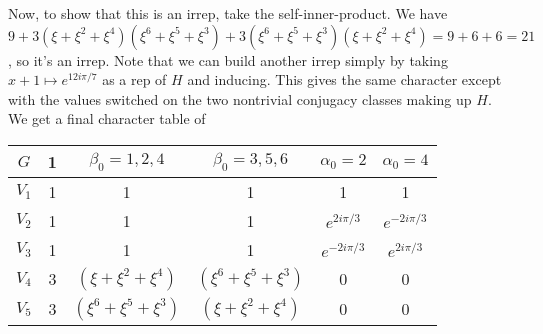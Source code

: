 \documentclass{article}
\begin{document}
Now, to show that this is an irrep, take the self-inner-product. We have $9+3(\xi+\xi^2+\xi^4)(\xi^6+\xi^5+\xi^3)+3(\xi^6+\xi^5+\xi^3)(\xi+\xi^2+\xi^4)=9+6+6=21$, so it's an irrep. Note that we can build another irrep simply by taking $x+1\mapsto e^{12i\pi/7}$ as a rep of $H$ and inducing. This gives the same character except with the values switched on the two nontrivial conjugacy classes making up $H$. We get a final character table of

\begin{tabular}{c|ccccc}
$G$&1&$\beta_0=1,2,4$&$\beta_0=3,5,6$&$\alpha_0=2$&$\alpha_0=4$\\
\hline
$V_1$&1&1&1&1&1\\
$V_2$&1&1&1&$e^{2i\pi/3}$&$e^{-2i\pi/3}$\\
$V_3$&1&1&1&$e^{-2i\pi/3}$&$e^{2i\pi/3}$\\
$V_4$&3&$(\xi+\xi^2+\xi^4)$&$(\xi^6+\xi^5+\xi^3)$&0&0\\
$V_5$&3&$(\xi^6+\xi^5+\xi^3)$&$(\xi+\xi^2+\xi^4)$&0&0\\
\end{tabular}
\end{document}
